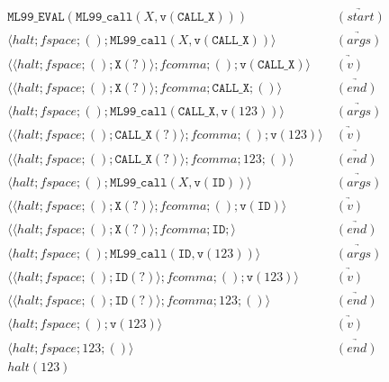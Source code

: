 \documentclass[12pt]{article}
\theoremstyle{break}
\begin{document}
\begin{example}
\begin{align*}
    \texttt{ML99\_EVAL}(\texttt{ML99\_call}(X, \texttt{v}(\texttt{CALL\_X}))) & \ \underrightarrow{(start)} \\
    \langle halt; fspace; (); \texttt{ML99\_call}(X, \texttt{v}(\texttt{CALL\_X})) \rangle & \ \underrightarrow{(args)} \\
    \langle \langle halt; fspace; (); \texttt{X}(?) \rangle; fcomma; (); \texttt{v}(\texttt{CALL\_X}) \rangle & \ \underrightarrow{(v)} \\
    \langle \langle halt; fspace; (); \texttt{X}(?) \rangle; fcomma; \texttt{CALL\_X}; () \rangle & \ \underrightarrow{(end)} \\
    \langle halt; fspace; (); \texttt{ML99\_call}(\texttt{CALL\_X}, \texttt{v}(123)) \rangle & \ \underrightarrow{(args)} \\
    \langle \langle halt; fspace; (); \texttt{CALL\_X}(?) \rangle; fcomma; (); \texttt{v}(123) \rangle & \ \underrightarrow{(v)} \\
    \langle \langle halt; fspace; (); \texttt{CALL\_X}(?) \rangle; fcomma; 123; () \rangle & \ \underrightarrow{(end)} \\
    \langle halt; fspace; (); \texttt{ML99\_call}(X, \texttt{v}(\texttt{ID})) \rangle & \ \underrightarrow{(args)} \\
    \langle \langle halt; fspace; (); \texttt{X}(?) \rangle; fcomma; (); \texttt{v}(\texttt{ID}) \rangle & \ \underrightarrow{(v)} \\
    \langle \langle halt; fspace; (); \texttt{X}(?) \rangle; fcomma; \texttt{ID}; \rangle & \ \underrightarrow{(end)} \\
    \langle halt; fspace; (); \texttt{ML99\_call}(\texttt{ID}, \texttt{v}(123)) \rangle & \ \underrightarrow{(args)} \\
    \langle \langle halt; fspace; (); \texttt{ID}(?) \rangle; fcomma; (); \texttt{v}(123) \rangle & \ \underrightarrow{(v)} \\
    \langle \langle halt; fspace; (); \texttt{ID}(?) \rangle; fcomma; 123; () \rangle & \ \underrightarrow{(end)} \\
    \langle halt; fspace; (); \texttt{v}(123) \rangle & \ \underrightarrow{(v)} \\
    \langle halt; fspace; 123; () \rangle & \ \underrightarrow{(end)} \\
    halt(123) &
\end{align*}
\end{example}
\end{document}
